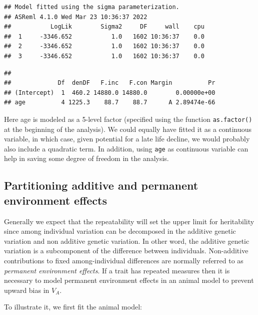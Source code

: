 \documentclass[
  12pt,
]{book}
\begin{document}
\begin{verbatim}
## Model fitted using the sigma parameterization.
## ASReml 4.1.0 Wed Mar 23 10:36:37 2022
##           LogLik        Sigma2     DF     wall    cpu
##  1     -3346.652           1.0   1602 10:36:37    0.0
##  2     -3346.652           1.0   1602 10:36:37    0.0
##  3     -3346.652           1.0   1602 10:36:37    0.0
\end{verbatim}

\begin{verbatim}
## 
##             Df  denDF   F.inc   F.con Margin          Pr
## (Intercept)  1  460.2 14880.0 14880.0        0.00000e+00
## age          4 1225.3    88.7    88.7      A 2.89474e-66
\end{verbatim}

Here age is modeled as a 5-level factor (specified using the function \texttt{as.factor()} at the beginning of the analysis). We could equally have fitted it as a continuous variable, in which case, given potential for a late life decline, we would probably also include a quadratic term.
In addition, using \texttt{age} as continuous variable can help in saving some degree of freedom in the analysis.

\hypertarget{partitioning-additive-and-permanent-environment-effects}{%
\subsection{Partitioning additive and permanent environment effects}\label{partitioning-additive-and-permanent-environment-effects}}

Generally we expect that the repeatability will set the upper limit for heritability since among individual variation can be decomposed in the additive genetic variation and non additive genetic variation. In other word, the additive genetic variation is a subcomponent of the difference between individuals.
Non-additive contributions to fixed among-individual differences are normally referred to as \emph{permanent environment effects}. If a trait has repeated measures then it is necessary to model permanent environment effects in an animal model to prevent upward bias in \(V_A\).

To illustrate it, we first fit the animal model:
\end{document}
